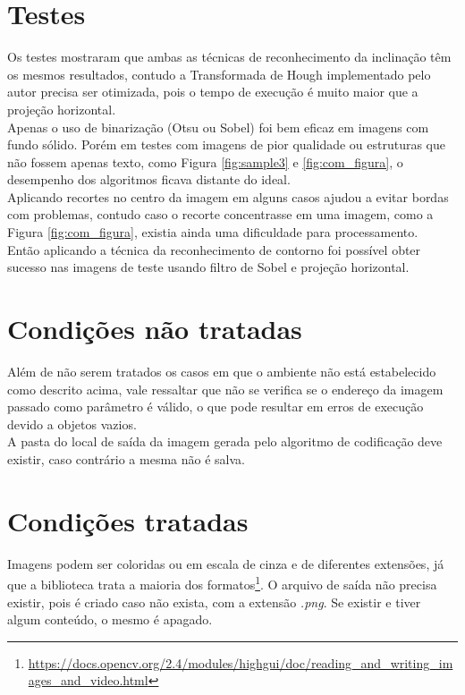 \documentclass[10pt,twocolumn,letterpaper]{article}
\begin{document}
\section{Testes}
Os testes mostraram que ambas as técnicas de reconhecimento da inclinação têm os mesmos resultados, contudo a Transformada de Hough implementado pelo autor precisa ser otimizada, pois o tempo de execução é muito maior que a projeção horizontal.\\
Apenas o uso de binarização (Otsu ou Sobel) foi bem eficaz em imagens com fundo sólido. Porém em testes com imagens de pior qualidade ou estruturas que não fossem apenas texto, como Figura \ref{fig:sample3} e \ref{fig:com_figura}, o desempenho dos algoritmos ficava distante do ideal.\\
Aplicando recortes no centro da imagem em alguns casos ajudou a evitar bordas com problemas, contudo caso o recorte concentrasse em uma imagem, como a Figura \ref{fig:com_figura}, existia ainda uma dificuldade para processamento.\\
Então aplicando a técnica da reconhecimento de contorno foi possível obter sucesso nas imagens de teste usando filtro de Sobel e projeção horizontal.

\section{Condições não tratadas}
Além de não serem tratados os casos em que o ambiente não está estabelecido como descrito acima, vale ressaltar que não se verifica se o endereço da imagem passado como parâmetro é válido, o que pode resultar em erros de execução devido a objetos vazios.\\
A pasta do local de saída da imagem gerada pelo algoritmo de codificação deve existir, caso contrário a mesma não é salva.\\

\section{Condições tratadas}
Imagens podem ser coloridas ou em escala de cinza e de diferentes extensões, já que a biblioteca trata a maioria dos formatos\footnote{\url{https://docs.opencv.org/2.4/modules/highgui/doc/reading_and_writing_images_and_video.html}}. O arquivo de saída não precisa existir, pois é criado caso não exista, com a extensão \emph{.png}. Se existir e tiver algum conteúdo, o mesmo é apagado.
\end{document}
